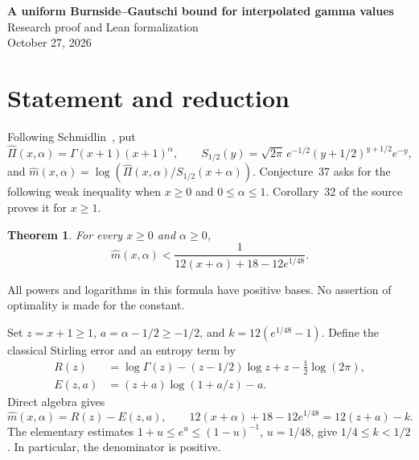 \documentclass[11pt]{article}
\newtheorem{theorem}{Theorem}
\begin{document}
\begin{center}
{\Large\bfseries A uniform Burnside--Gautschi bound for interpolated gamma values}\\[.5em]
Research proof and Lean formalization\\
October 27, 2026
\end{center}
\begin{abstract}
We prove Conjecture~37 of Schmidlin's paper on Stirling--Gautschi inequalities.
The proposed upper bound holds strictly for every nonnegative base point and,
more generally, every nonnegative interpolation parameter. The argument combines
a classical three-term Stirling remainder bound with a logarithmic entropy estimate.
The remaining rational inequality is certified by a quadratic discriminant whose
coefficients become positive after translation. The Lean proof includes the literal
gamma-function expression and a proof of the classical remainder bound.
\end{abstract}

\section{Statement and reduction}
Following Schmidlin~\cite{S}, put
\[
 \widehat\Pi(x,\alpha)=\Gamma(x+1)(x+1)^\alpha,
 \qquad S_{1/2}(y)=\sqrt{2\pi}\,e^{-1/2}(y+1/2)^{y+1/2}e^{-y},
\]
and $\widehat m(x,\alpha)=\log(\widehat\Pi(x,\alpha)/S_{1/2}(x+\alpha))$.
Conjecture~37 asks for the following weak inequality when $x\ge0$ and
$0\le\alpha\le1$. Corollary~32 of the source proves it for $x\ge1$.
\begin{theorem}\label{main}
For every $x\ge0$ and $\alpha\ge0$,
\[
 \widehat m(x,\alpha)<
 \frac{1}{12(x+\alpha)+18-12e^{1/48}}.
\]
\end{theorem}
All powers and logarithms in this formula have positive bases. No assertion of
optimality is made for the constant.

Set $z=x+1\ge1$, $a=\alpha-1/2\ge-1/2$, and $k=12(e^{1/48}-1)$.
Define the classical Stirling error and an entropy term by
\begin{align}
 R(z)&=\log\Gamma(z)-(z-1/2)\log z+z-\tfrac12\log(2\pi),\label{R}\\
 E(z,a)&=(z+a)\log(1+a/z)-a.\label{E}
\end{align}
Direct algebra gives
\[
 \widehat m(x,\alpha)=R(z)-E(z,a),\qquad
 12(x+\alpha)+18-12e^{1/48}=12(z+a)-k.
\]
The elementary estimates $1+u\le e^u\le(1-u)^{-1}$, $u=1/48$, give
$1/4\le k<1/2$. In particular, the denominator is positive.
\end{document}
